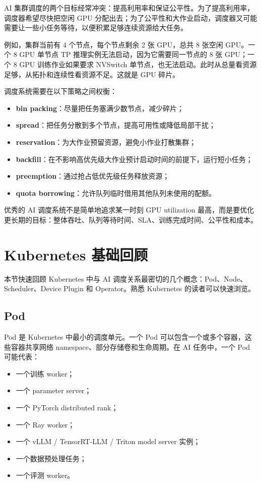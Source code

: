 AI 集群调度的两个目标经常冲突：提高利用率和保证公平性。为了提高利用率，调度器希望尽快把空闲 GPU 分配出去；为了公平性和大作业启动，调度器又可能需要让一些小任务等待，以便积累足够连续资源给大任务。

例如，集群当前有 4 个节点，每个节点剩余 2 张 GPU，总共 8 张空闲 GPU。一个 8 GPU 单节点 TP 推理实例无法启动，因为它需要同一节点的 8 张 GPU；一个 8 GPU 训练作业如果要求 NVSwitch 单节点，也无法启动。此时从总量看资源足够，从拓扑和连续性看资源不足。这就是 GPU 碎片。

调度系统需要在以下策略之间权衡：

\begin{itemize}
  \item \textbf{bin packing}：尽量把任务塞满少数节点，减少碎片；
  \item \textbf{spread}：把任务分散到多个节点，提高可用性或降低局部干扰；
  \item \textbf{reservation}：为大作业预留资源，避免小作业打散集群；
  \item \textbf{backfill}：在不影响高优先级大作业预计启动时间的前提下，运行短小任务；
  \item \textbf{preemption}：通过抢占低优先级任务释放资源；
  \item \textbf{quota borrowing}：允许队列临时借用其他队列未使用的配额。
\end{itemize}

优秀的 AI 调度系统不是简单地追求某一时刻 GPU utilization 最高，而是要优化更长期的目标：整体吞吐、队列等待时间、SLA、训练完成时间、公平性和成本。

\section{Kubernetes 基础回顾}
\label{sec:kubernetes-basics-review}

本节快速回顾 Kubernetes 中与 AI 调度关系最密切的几个概念：Pod、Node、Scheduler、Device Plugin 和 Operator。熟悉 Kubernetes 的读者可以快速浏览。

\subsection{Pod}
\label{subsec:pod}

Pod 是 Kubernetes 中最小的调度单元。一个 Pod 可以包含一个或多个容器，这些容器共享网络 namespace、部分存储卷和生命周期。在 AI 任务中，一个 Pod 可能代表：

\begin{itemize}
  \item 一个训练 worker；
  \item 一个 parameter server；
  \item 一个 PyTorch distributed rank；
  \item 一个 Ray worker；
  \item 一个 vLLM / TensorRT-LLM / Triton model server 实例；
  \item 一个数据预处理任务；
  \item 一个评测 worker。
\end{itemize}

